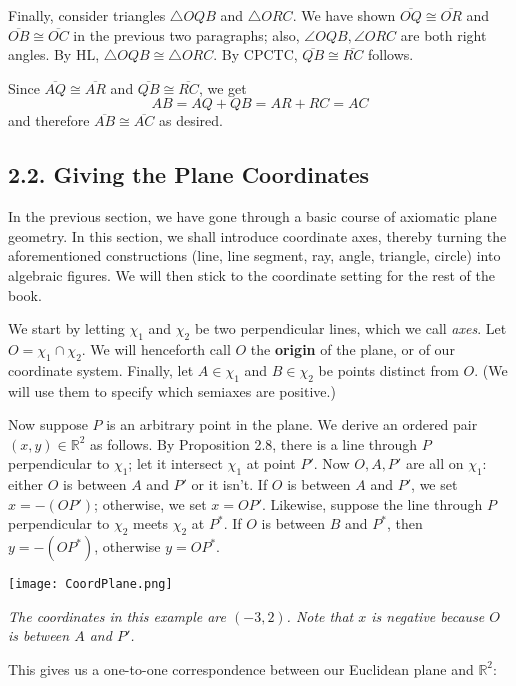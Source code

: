 \documentclass[leqno]{book}
\begin{document}
\begin{enumerate}
Finally, consider triangles $\triangle OQB$ and $\triangle ORC$.  We have shown $\overline{OQ}\cong\overline{OR}$ and $\overline{OB}\cong\overline{OC}$ in the previous two paragraphs; also, $\angle OQB,\angle ORC$ are both right angles.  By HL, $\triangle OQB\cong\triangle ORC$.  By CPCTC, $\overline{QB}\cong\overline{RC}$ follows.

Since $\overline{AQ}\cong\overline{AR}$ and $\overline{QB}\cong\overline{RC}$, we get
$$AB=AQ+QB=AR+RC=AC$$
and therefore $\overline{AB}\cong\overline{AC}$ as desired.
\end{enumerate}

\subsection*{2.2. Giving the Plane Coordinates}
In the previous section, we have gone through a basic course of axiomatic plane geometry.  In this section, we shall introduce coordinate axes, thereby turning the aforementioned constructions (line, line segment, ray, angle, triangle, circle) into algebraic figures.  We will then stick to the coordinate setting for the rest of the book.

We start by letting $\chi_1$ and $\chi_2$ be two perpendicular lines, which we call \emph{axes}.  Let $O=\chi_1\cap\chi_2$.  We will henceforth call $O$ the \textbf{origin} of the plane, or of our coordinate system.  Finally, let $A\in\chi_1$ and $B\in\chi_2$ be points distinct from $O$.  (We will use them to specify which semiaxes are positive.)

Now suppose $P$ is an arbitrary point in the plane.  We derive an ordered pair $(x,y)\in\mathbb R^2$ as follows.  By Proposition 2.8, there is a line through $P$ perpendicular to $\chi_1$; let it intersect $\chi_1$ at point $P'$.  Now $O,A,P'$ are all on $\chi_1$: either $O$ is between $A$ and $P'$ or it isn't.  If $O$ is between $A$ and $P'$, we set $x=-(OP')$; otherwise, we set $x=OP'$.  Likewise, suppose the line through $P$ perpendicular to $\chi_2$ meets $\chi_2$ at $P^*$.  If $O$ is between $B$ and $P^*$, then $y=-(OP^*)$, otherwise $y=OP^*$.
\begin{center}\texttt{[image: CoordPlane.png]}

\emph{The coordinates in this example are $(-3,2)$.  Note that $x$ is negative because $O$ is between $A$ and $P'$.}\end{center}

\noindent This gives us a one-to-one correspondence between our Euclidean plane and $\mathbb R^2$:\\
\end{document}
